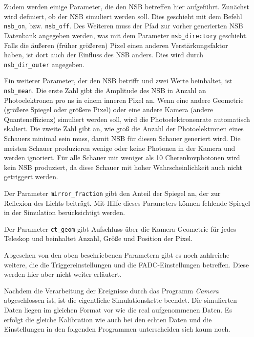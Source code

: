 Zudem werden einige Parameter, die den NSB betreffen hier aufgeführt.
Zunächst wird definiert, ob der NSB simuliert werden soll. 
Dies geschieht mit dem Befehl \texttt{nsb\_on}, bzw. \texttt{nsb\_off}.
Des Weiteren muss der Pfad zur vorher generierten NSB Datenbank angegeben werden, was mit dem Parameter \texttt{nsb\_directory} geschieht.
Falls die äußeren (früher größeren) Pixel einen anderen Verstärkungsfaktor haben, ist dort auch der Einfluss des NSB anders. 
Dies wird durch \texttt{nsb\_dir\_outer} angegeben.

Ein weiterer Parameter, der den NSB betrifft und zwei Werte beinhaltet, ist \texttt{nsb\_mean}.
Die erste Zahl gibt die Amplitude des NSB in Anzahl an Photoelektronen pro ns in einem inneren Pixel an.
Wenn eine andere Geometrie (größere Spiegel oder größere Pixel) oder eine andere Kamera (andere Quanteneffizienz) simuliert werden soll, wird die Photoelektronenrate automatisch skaliert.
Die zweite Zahl gibt an, wie groß die Anzahl der Photoelektronen eines Schauers minimal sein muss, damit NSB für diesen Schauer generiert wird.
Die meisten Schauer produzieren wenige oder keine Photonen in der Kamera und werden ignoriert.
Für alle Schauer mit weniger als 10 Cherenkovphotonen wird kein NSB produziert, da diese Schauer mit hoher Wahrscheinlichkeit auch nicht getriggert werden.

Der Parameter \texttt{mirror\_fraction} gibt den Anteil der Spiegel an, der zur Reflexion des Lichts beiträgt. 
Mit Hilfe dieses Parameters können fehlende Spiegel in der Simulation berücksichtigt werden.

Der Parameter \texttt{ct\_geom} gibt Aufschluss über die Kamera-Geometrie für jedes Teleskop und beinhaltet Anzahl, Größe und Position der Pixel.

Abgesehen von den oben beschriebenen Parametern gibt es noch zahlreiche weitere, die die Triggereinstellungen und die FADC-Einstellungen betreffen.
Diese werden hier aber nicht weiter erläutert.

Nachdem die Verarbeitung der Ereignisse durch das Programm \textit{Camera} abgeschlossen ist, ist die eigentliche Simulationskette beendet.
Die simulierten Daten liegen im gleichen Format vor wie die real aufgenommenen Daten.
Es erfolgt die gleiche Kalibration wie auch bei den echten Daten und die Einstellungen in den folgenden Programmen unterscheiden sich kaum noch.

